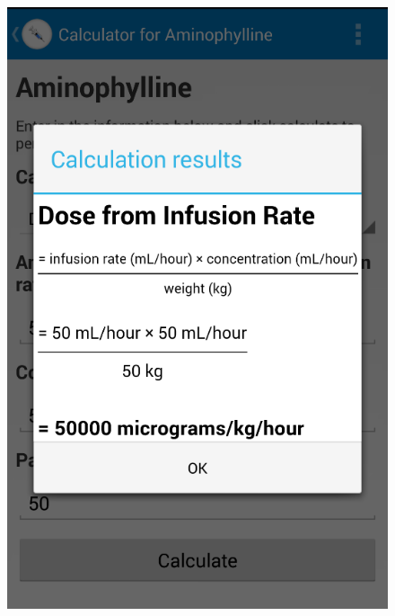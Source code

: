 \begin{figure}[H]
\begin{minipage}{.5\textwidth}
  \includegraphics[width=.8\linewidth]{Images/screenshots/API18/calcResult.png}
\end{minipage}
\end{figure}

